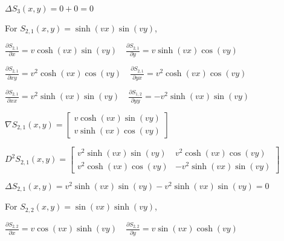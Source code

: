 \documentclass[12pt, executivepaper]{article}
\begin{document}
\begin{flushleft}
$\Delta S_{3}(x,y)=0+0=0$

\vspace{5mm}

For $S_{2,1}(x,y)=\sinh(vx)\sin(vy)$, \\

\vspace{3mm}

$\frac{\partial S_{2,1}}{\partial x}=v\cosh(vx)\sin(vy) \quad \frac{\partial S_{2,1}}{\partial y}=v\sinh(vx)\cos(vy)$ \\

\vspace{3mm}

$\frac{\partial S_{2,1}}{\partial xy}=v^2\cosh(vx)\cos(vy) \quad \frac{\partial S_{2,1}}{\partial yx}=v^2\cosh(vx)\cos(vy)$ \\

\vspace{3mm}

$\frac{\partial S_{2,1}}{\partial xx}=v^2\sinh(vx)\sin(vy) \quad \frac{\partial S_{1,2}}{\partial yy}=-v^2\sinh(vx)\sin(vy)$ \\

\vspace{3mm}

$\nabla S_{2,1}(x,y)=
\begin{bmatrix}
v\cosh(vx)\sin(vy) \\
v\sinh(vx)\cos(vy)
\end{bmatrix}$

\vspace{3mm}

$D^2 S_{2,1}(x,y)=
\begin{bmatrix}
v^2\sinh(vx)\sin(vy) & v^2\cosh(vx)\cos(vy) \\
v^2\cosh(vx)\cos(vy) & -v^2\sinh(vx)\sin(vy)
\end{bmatrix}$

\vspace{3mm}

$\Delta S_{2,1}(x,y)=v^2\sinh(vx)\sin(vy)-v^2\sinh(vx)\sin(vy)=0$

\vspace{5mm}

For $S_{2,2}(x,y)=\sin(vx)\sinh(vy)$, \\

\vspace{3mm}

$\frac{\partial S_{2,2}}{\partial x}=v\cos(vx)\sinh(vy) \quad \frac{\partial S_{2,2}}{\partial y}=v\sin(vx)\cosh(vy)$ \\


\end{flushleft}
\end{document}
